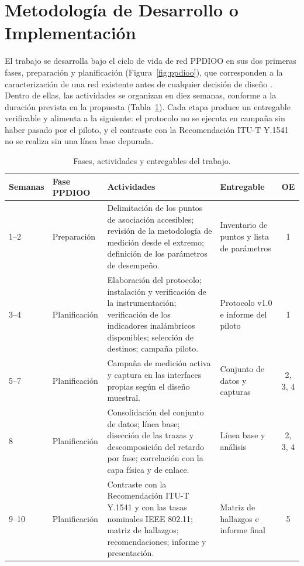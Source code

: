 \section{Metodología de Desarrollo o Implementación}

El trabajo se desarrolla bajo el ciclo de vida de red PPDIOO en sus dos primeras fases, preparación y planificación (Figura~\ref{fig:ppdioo}), que corresponden a la caracterización de una red existente antes de cualquier decisión de diseño \cite{oppenheimer2011topdown}. Dentro de ellas, las actividades se organizan en diez semanas, conforme a la duración prevista en la propuesta (Tabla~\ref{tab:cronograma}). Cada etapa produce un entregable verificable y alimenta a la siguiente: el protocolo no se ejecuta en campaña sin haber pasado por el piloto, y el contraste con la Recomendación ITU-T Y.1541 no se realiza sin una línea base depurada.

\begin{table}[htbp]
  \centering
  \caption{Fases, actividades y entregables del trabajo.}
  \label{tab:cronograma}
  \footnotesize
  \renewcommand{\arraystretch}{1.25}
  \begin{tabularx}{\textwidth}{|p{1.6cm}|p{2.3cm}|>{\raggedright\arraybackslash}X|>{\raggedright\arraybackslash}p{3.4cm}|c|}
    \hline
    \textbf{Semanas} & \textbf{Fase PPDIOO} & \textbf{Actividades} & \textbf{Entregable} & \textbf{OE} \\
    \hline
    1--2 & Preparación & Delimitación de los puntos de asociación accesibles; revisión de la metodología de medición desde el extremo; definición de los parámetros de desempeño. & Inventario de puntos y lista de parámetros & 1 \\
    \hline
    3--4 & Planificación & Elaboración del protocolo; instalación y verificación de la instrumentación; verificación de los indicadores inalámbricos disponibles; selección de destinos; campaña piloto. & Protocolo v1.0 e informe del piloto & 1 \\
    \hline
    5--7 & Planificación & Campaña de medición activa y captura en las interfaces propias según el diseño muestral. & Conjunto de datos y capturas & 2, 3, 4 \\
    \hline
    8 & Planificación & Consolidación del conjunto de datos; línea base; disección de las trazas y descomposición del retardo por fase; correlación con la capa física y de enlace. & Línea base y análisis & 2, 3, 4 \\
    \hline
    9--10 & Planificación & Contraste con la Recomendación ITU-T Y.1541 y con las tasas nominales IEEE 802.11; matriz de hallazgos; recomendaciones; informe y presentación. & Matriz de hallazgos e informe final & 5 \\
    \hline
  \end{tabularx}
  \vspace{2pt}
  \raggedright
\end{table}

